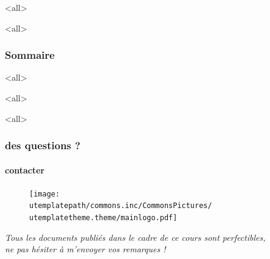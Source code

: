 \documentclass[ignorenonframetext,allowframebreaks,aspectratio=169,t,8pt, xcolor=table]{beamer}
\title[\ushorttitle]{\utitle}
\subtitle{\tiny\uCourseLongName}
\author[\uauthorwriter]{ \LARGE{\uauthor} \\ \medskip {\small \url{\umaila} \and \url{\umailb}\\ {\small \url{\usitea}}}}
\institute[\uinstituteshort]{{\uinstitute \\ \uchaire}}
\date[\uversion]{\tiny{Publication \INFODistrib ~du \\ \DTMnow}}
\begin{document}
\mode<all>{}
\begin{frame}[plain]

           
                 \titlepage
\end{frame}

\mode<all>{}
\begin{frame}
\frametitle{Sommaire}
\begin{multicols}{2}
\tableofcontents[hideallsubsections]
\end{multicols}
\end{frame}

\mode<all>{}

\mode<all>{\ubody}


\mode<all>{}
\begin{frame}
\frametitle{des questions ?}
\framesubtitle{contacter \umaila}
     \begin{figure}
      \centering
           \texttt{[image: \\utemplatepath/commons.inc/CommonsPictures/\\utemplatetheme.theme/mainlogo.pdf]}\\
 \end{figure}
     \centering \textit{Tous les documents publiés dans le cadre de ce cours sont perfectibles, \\ne pas hésiter à m'envoyer vos remarques !}
\end{frame}
\end{document}
